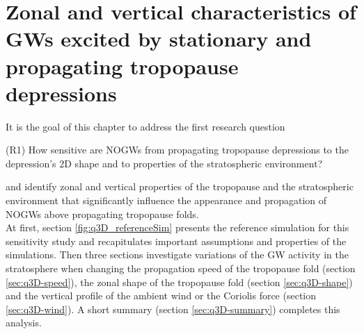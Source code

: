 \chapter{Zonal and vertical characteristics of GWs excited by stationary and propagating tropopause depressions}
\label{sec:resultsQ3D}
It is the goal of this chapter to address the first research question
\begin{tcolorbox}[]
    (R1) How sensitive are NOGWs from propagating tropopause depressions to the depression's 2D shape and to properties of the stratospheric environment?
\end{tcolorbox}
\noindent and identify zonal and vertical properties of the tropopause and the stratospheric environment that significantly influence the appearance and propagation of NOGWs above propagating tropopause folds. \\
At first, section \ref{fig:q3D_referenceSim} presents the reference simulation for this sensitivity study and recapitulates important assumptions and properties of the simulations. Then three sections investigate variations of the GW activity in the stratosphere when changing the propagation speed of the tropopause fold (section \ref{sec:q3D-speed}), the zonal shape of the tropopause fold (section \ref{sec:q3D-shape}) and the vertical profile of the ambient wind or the Coriolis force (section \ref{sec:q3D-wind}). A short summary (section \ref{sec:q3D-summary}) completes this analysis. 

